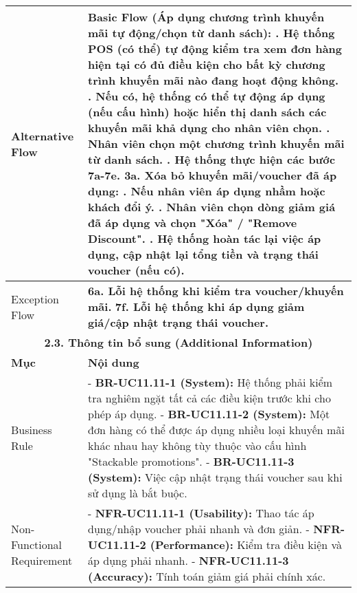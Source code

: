 \begin{longtable}{|m{4cm}|p{11cm}|}
Alternative Flow & \textbf{Basic Flow (Áp dụng chương trình khuyến mãi tự động/chọn từ danh sách):} \newline    1. Hệ thống POS (có thể) tự động kiểm tra xem đơn hàng hiện tại có đủ điều kiện cho bất kỳ chương trình khuyến mãi nào đang hoạt động không. \newline    2. Nếu có, hệ thống có thể tự động áp dụng (nếu cấu hình) hoặc hiển thị danh sách các khuyến mãi khả dụng cho nhân viên chọn. \newline    3. Nhân viên chọn một chương trình khuyến mãi từ danh sách. \newline    4. Hệ thống thực hiện các bước 7a-7e. \newline \textbf{3a. Xóa bỏ khuyến mãi/voucher đã áp dụng:} \newline    1. Nếu nhân viên áp dụng nhầm hoặc khách đổi ý. \newline    2. Nhân viên chọn dòng giảm giá đã áp dụng và chọn "Xóa" / "Remove Discount". \newline    3. Hệ thống hoàn tác lại việc áp dụng, cập nhật lại tổng tiền và trạng thái voucher (nếu có). \\
\hline
Exception Flow & \textbf{6a. Lỗi hệ thống khi kiểm tra voucher/khuyến mãi.} \newline \textbf{7f. Lỗi hệ thống khi áp dụng giảm giá/cập nhật trạng thái voucher.} \\
\hline
\multicolumn{2}{|c|}{\textbf{2.3. Thông tin bổ sung (Additional Information)}} \\
\hline
\textbf{Mục} & \textbf{Nội dung} \\
\hline
Business Rule & - \textbf{BR-UC11.11-1 (System):} Hệ thống phải kiểm tra nghiêm ngặt tất cả các điều kiện trước khi cho phép áp dụng. \newline - \textbf{BR-UC11.11-2 (System):} Một đơn hàng có thể được áp dụng nhiều loại khuyến mãi khác nhau hay không tùy thuộc vào cấu hình "Stackable promotions". \newline - \textbf{BR-UC11.11-3 (System):} Việc cập nhật trạng thái voucher sau khi sử dụng là bắt buộc. \\
\hline
Non-Functional Requirement & - \textbf{NFR-UC11.11-1 (Usability):} Thao tác áp dụng/nhập voucher phải nhanh và đơn giản. \newline - \textbf{NFR-UC11.11-2 (Performance):} Kiểm tra điều kiện và áp dụng phải nhanh. \newline - \textbf{NFR-UC11.11-3 (Accuracy):} Tính toán giảm giá phải chính xác. \\
\hline
\end{longtable}

